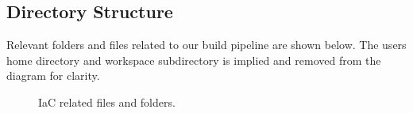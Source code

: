 \clearpage
\subsection{Directory Structure}

\justify
Relevant folders and files related to our build pipeline are shown
below. The users home directory and workspace subdirectory is implied
and removed from the diagram for clarity.

\begin{figure}[!htb]
  
  \caption{IaC related files and folders.}
\end{figure}
